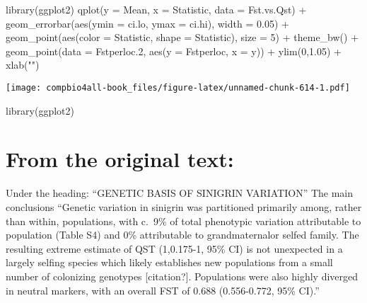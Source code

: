 \documentclass[
]{book}
\newenvironment{Shaded}{\begin{snugshade}}{\end{snugshade}}
\newcommand{\AttributeTok}[1]{\textcolor[rgb]{0.77,0.63,0.00}{#1}}
\newcommand{\DecValTok}[1]{\textcolor[rgb]{0.00,0.00,0.81}{#1}}
\newcommand{\FloatTok}[1]{\textcolor[rgb]{0.00,0.00,0.81}{#1}}
\newcommand{\FunctionTok}[1]{\textcolor[rgb]{0.00,0.00,0.00}{#1}}
\newcommand{\NormalTok}[1]{#1}
\newcommand{\SpecialCharTok}[1]{\textcolor[rgb]{0.00,0.00,0.00}{#1}}
\newcommand{\StringTok}[1]{\textcolor[rgb]{0.31,0.60,0.02}{#1}}
\begin{document}
\begin{Shaded}
\begin{Highlighting}[]
\FunctionTok{library}\NormalTok{(ggplot2)}
\FunctionTok{qplot}\NormalTok{(}\AttributeTok{y =}\NormalTok{ Mean,}
      \AttributeTok{x =}\NormalTok{ Statistic,}
      \AttributeTok{data =}\NormalTok{ Fst.vs.Qst) }\SpecialCharTok{+}
  \FunctionTok{geom\_errorbar}\NormalTok{(}\FunctionTok{aes}\NormalTok{(}\AttributeTok{ymin =}\NormalTok{ ci.lo, }\AttributeTok{ymax =}\NormalTok{ ci.hi),}
                \AttributeTok{width =} \FloatTok{0.05}\NormalTok{) }\SpecialCharTok{+}
  \FunctionTok{geom\_point}\NormalTok{(}\FunctionTok{aes}\NormalTok{(}\AttributeTok{color =}\NormalTok{ Statistic, }
                 \AttributeTok{shape =}\NormalTok{ Statistic),}
             \AttributeTok{size =} \DecValTok{5}\NormalTok{) }\SpecialCharTok{+}
  \FunctionTok{theme\_bw}\NormalTok{() }\SpecialCharTok{+}
  \FunctionTok{geom\_point}\NormalTok{(}\AttributeTok{data =}\NormalTok{ Fstperloc}\FloatTok{.2}\NormalTok{,}
             \FunctionTok{aes}\NormalTok{(}\AttributeTok{y =}\NormalTok{ Fstperloc, }\AttributeTok{x =}\NormalTok{ y)) }\SpecialCharTok{+}
  \FunctionTok{ylim}\NormalTok{(}\DecValTok{0}\NormalTok{,}\FloatTok{1.05}\NormalTok{) }\SpecialCharTok{+}
  \FunctionTok{xlab}\NormalTok{(}\StringTok{""}\NormalTok{)}
\end{Highlighting}
\end{Shaded}

\texttt{[image: compbio4all-book\_files/figure-latex/unnamed-chunk-614-1.pdf]}

library(ggplot2)

\hypertarget{from-the-original-text}{%
\chapter{From the original text:}\label{from-the-original-text}}

Under the heading: ``GENETIC BASIS OF SINIGRIN VARIATION''
The main conclusions
``Genetic variation in sinigrin was partitioned primarily among, rather than within, populations, with c.~9\% of total phenotypic variation attributable to population (Table S4) and 0\% attributable to grandmaternalor selfed family. The resulting extreme estimate of QST (1,0.175-1, 95\% CI) is not unexpected in a largely selfing species which likely establishes new populations from a small number of colonizing genotypes {[}citation?{]}. Populations were also highly diverged in neutral markers, with an overall FST of 0.688 (0.556-0.772, 95\% CI).''
\end{document}
